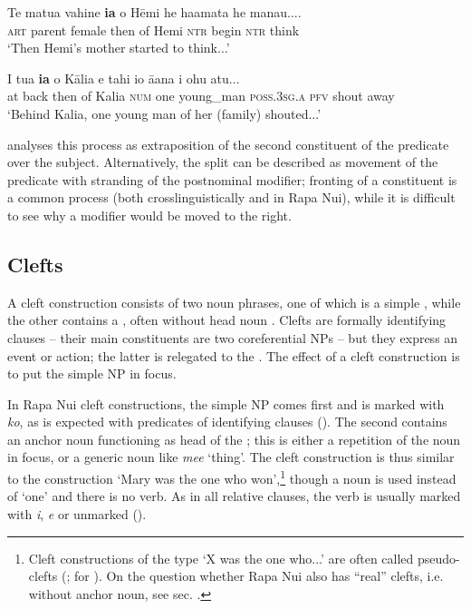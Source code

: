 \ea\label{ex:9.38}
\gll Te matu{\ꞌ}a vahine \textbf{ia} o Hēmi he ha{\ꞌ}amata he mana{\ꞌ}u.... \\
\textsc{art} parent female then of Hemi \textsc{ntr} begin \textsc{ntr} think \\

\glt 
‘Then Hemi’s mother started to think...’ \textstyleExampleref{[R476.042]} 
\z

\ea\label{ex:9.39}
\gll {\ꞌ}I tu{\ꞌ}a \textbf{ia} o Kālia e tahi io {\ꞌ}ā{\ꞌ}ana i ohu atu...\\
at back then of Kalia \textsc{num} one young\_man \textsc{poss.3sg.a} \textsc{pfv} shout away\\

\glt 
‘Behind Kalia, one young man of her (family) shouted...’ \textstyleExampleref{[R345.084]} 
\z

\citet[119–120]{Clark1976} analyses this process as extraposition of the second constituent of the predicate over the subject. Alternatively, the split can be described as movement of the predicate with stranding of the postnominal modifier; fronting of a constituent is a common process (both crosslinguistically and in Rapa Nui), while it is difficult to see why a modifier would be moved to the right.
\subsection{Clefts}\label{sec:9.2.6}
A cleft construction consists of two noun phrases, one of which is a simple , while the other contains a , often without head noun \citep[278]{Payne1997}. Clefts are formally identifying clauses – their main constituents are two coreferential NPs – but they express an event or action; the latter is relegated to the . The effect of a cleft construction is to put the simple NP in focus.

In Rapa Nui cleft constructions, the simple NP comes first and is marked with \textit{ko}, as is expected with predicates of identifying clauses (). The second  contains an anchor noun functioning as head of the ; this is either a repetition of the noun in focus, or a generic noun like \textit{me{\ꞌ}e} ‘thing’. The cleft construction is thus similar to the  construction ‘Mary was the one who won’,\footnote{\label{fn:468}Cleft constructions of the type ‘X was the one who...’ are often called pseudo-clefts (\citealt[279]{Payne1997}; \citealt[9]{Bauer1991} for ). On the question whether Rapa Nui also has “real” clefts, i.e. without anchor noun, see sec. .} though a noun is used instead of ‘one’ and there is no  verb. As in all relative clauses, the verb is usually marked with \textit{i}, \textit{e} or unmarked ().

